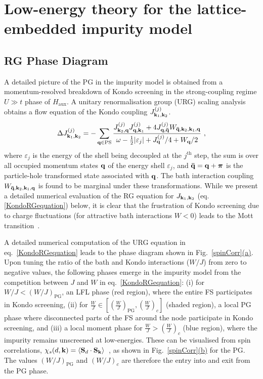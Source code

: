\section{Low-energy theory for the lattice-embedded impurity model}\label{kondobreakdownsection}
\subsection{RG Phase Diagram}
A detailed picture of the PG in the impurity model is obtained from a momentum-resolved breakdown of Kondo screening in the strong-coupling regime $U \gg t$ phase of $H_\text{aux}$. A unitary renormalisation group (URG) scaling analysis~\cite{anirbanurg1} obtains a flow equation of the Kondo coupling \(J^{(j)}_{{\bf k}_1, {\bf k}_2}\).
\begin{equation}\begin{aligned}\label{KondoRGequation}
	\Delta J^{(j)}_{{\bf k}_1, {\bf k}_2} = -\sum_{{\bf q} \in \text{PS}} \frac{J^{(j)}_{{\bf k}_2,{\bf q}} J^{(j)}_{{\bf q},{\bf k}_1} + 4J^{(j)}_{{\bf q}, {\bf \bar q}} W_{{\bf \bar q}, {\bf k}_2, {\bf k}_1, {\bf q}}}{\omega - \frac{1}{2}|\varepsilon_j| + J^{(j)}_{{\bf q}}/4 + W_{{\bf q}}/2}~,
\end{aligned}\end{equation}
where \(\varepsilon_j\) is the energy of the shell being decoupled at the \(j^\text{th}\) step, the sum is over all occupied momentum states \({\bf q}\) of the energy shell \(\varepsilon_j\), and  \({\bf \bar q} = {\bf q} + {\boldsymbol \pi}\) is the particle-hole transformed state associated with ${\bf q}$. The bath interaction coupling $W_{{\bf \bar q}, {\bf k}_2, {\bf k}_1, {\bf q}}$ is found to be marginal under these transformations. While we present a detailed numerical evaluation of the RG equation for $J_{{\bf k}_1, {\bf k}_2}$ (eq.\eqref{KondoRGequation}) below, it is clear that the frustration of Kondo screening due to charge fluctuations (for attractive bath interactions $W<0$) leads to the Mott transition~\cite{Mukherjee_2023}.


A detailed numerical computation of the URG equation in eq.~\eqref{KondoRGequation} leads to the phase diagram shown in Fig.~\hyperref[spinCorr]{\ref*{spinCorr}(a)}. Upon tuning the ratio of the bath and Kondo interactions ($W/J$) from zero to negative values, the following phases emerge in the impurity model from the competition between $J$ and $W$ in eq.~\eqref{KondoRGequation}: (i) for $W/J<(W/J)_{\text{PG}}$, an LFL phase (red region), where the entire FS participates in Kondo screening, (ii) for $\frac{W}{J} \in [(\frac{W}{J})_{\text{PG}}, (\frac{W}{J})_c]$ (shaded region), a local PG phase where disconnected parts of the FS around the node participate in Kondo screening, and (iii) a local moment phase for $\frac{W}{J} > (\frac{W}{J})_c$ (blue region), where the impurity remains unscreened at low-energies. These can be visualised from spin correlations, $\chi_s(d,{\bf k}) = \braket{{\bf S}_d\cdot{\bf S}_{\bf k}}$~, as shown in Fig.~\hyperref[spinCorr]{\ref*{spinCorr}(b)} for the PG. The values $(W/J)_{\text{PG}}$ and $(W/J)_c$ are therefore the entry into and exit from the PG phase.

